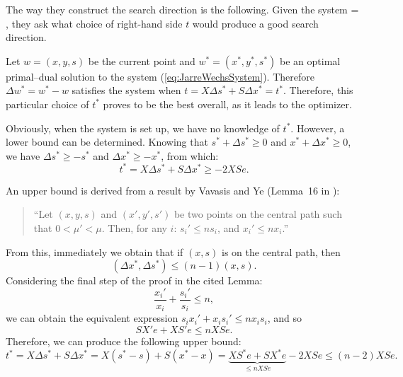 The way they construct the search direction is the following. 
Given the system
\be
\label{eq:JarreWechsSystem}
 =
\left[ \begin{array}{c}
    b-Ax \\ c-A^Ty-s \\ t
  \end{array} \right],
\ee
they ask what 
choice of right-hand side $t$ would produce a good search direction.

Let $w=(x,y,s)$ be the current point and 
$w^*=(x^*,y^*,s^*)$ be an optimal primal--dual solution to 
the system (\ref{eq:JarreWechsSystem}).
Therefore $\Delta w^*= w^*-w$ satisfies the 
system when $t=X\Delta s^* + S\Delta x^*=t^*$. Therefore,
this particular choice of $t^*$ proves to be the best overall,
as it leads to the optimizer.

Obviously, when the system is set up, we have no knowledge of 
$t^*$. However, a lower bound can be determined. Knowing that 
$s^*+\Delta s^* \ge 0$ and $x^*+\Delta x^* \ge 0$, we have 
$\Delta s^* \ge -s^*$ and $\Delta x^* \ge -x^*$, from which:
\[
t^*= X\Delta s^* + S\Delta x^* \ge -2XSe.
\]


An upper bound is derived from a result by Vavasis and Ye 
(Lemma~16 in \cite{VavasisYe}):
\begin{quote}
``Let $(x,y,s)$ and $(x',y',s')$ be two points on the central 
path such that $0<\mu'<\mu$. Then, for any $i$:
$s_i' \le ns_i$, and $x_i' \le nx_i$.''
\end{quote}

From this, immediately we obtain that if $(x,s)$ is on the 
central path, then
\[
(\Delta x^*,\Delta s^*)\le(n-1)(x,s).
\]
Considering the final step of the proof in the cited Lemma:
\[
\frac{x_i'}{x_i} +\frac{s_i'}{s_i} \le n,
\]
we can obtain the equivalent expression 
$s_ix_i' + x_is_i' \le nx_is_i$, and so
\[
SX'e + XS'e \le nXSe.
\]
Therefore, we can produce the following upper bound:
\[
t^*= X\Delta s^* +S\Delta x^* = X(s^*-s)+S(x^*-x) = 
     \underbrace{XS^*e + SX^*e}_{\le nXSe} -2XSe \le (n-2) XSe.
\]

